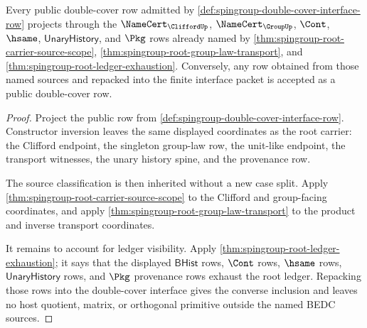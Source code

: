 \begin{theorem}
\label{thm:spingroup-double-cover-source-exhaustion}
Every public double-cover row admitted by \autoref{def:spingroup-double-cover-interface-row} projects through the $\NameCert_{\CliffordUp}$, $\NameCert_{\GroupUp}$, $\Cont$, $\hsame$, $\mathsf{UnaryHistory}$, and $\Pkg$ rows already named by \autoref{thm:spingroup-root-carrier-source-scope}, \autoref{thm:spingroup-root-group-law-transport}, and \autoref{thm:spingroup-root-ledger-exhaustion}. Conversely, any row obtained from those named sources and repacked into the finite interface packet is accepted as a public double-cover row.
\end{theorem}
\begin{proof}
Project the public row from \autoref{def:spingroup-double-cover-interface-row}. Constructor inversion leaves the same displayed coordinates as the root carrier: the Clifford endpoint, the singleton group-law row, the unit-like endpoint, the transport witnesses, the unary history spine, and the provenance row.

The source classification is then inherited without a new case split. Apply \autoref{thm:spingroup-root-carrier-source-scope} to the Clifford and group-facing coordinates, and apply \autoref{thm:spingroup-root-group-law-transport} to the product and inverse transport coordinates.

It remains to account for ledger visibility. Apply \autoref{thm:spingroup-root-ledger-exhaustion}; it says that the displayed $\mathsf{BHist}$ rows, $\Cont$ rows, $\hsame$ rows, $\mathsf{UnaryHistory}$ rows, and $\Pkg$ provenance rows exhaust the root ledger. Repacking those rows into the double-cover interface gives the converse inclusion and leaves no host quotient, matrix, or orthogonal primitive outside the named BEDC sources.
\end{proof}


